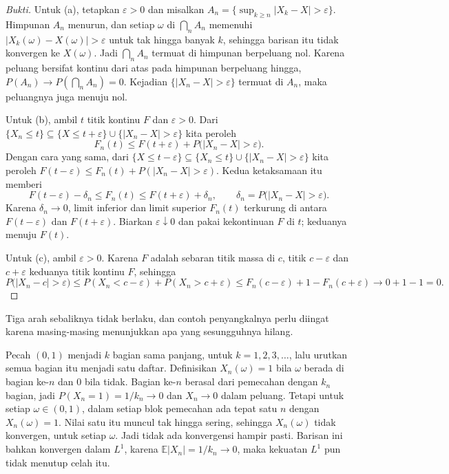 \begin{proof}[Bukti]
Untuk (a), tetapkan $\varepsilon>0$ dan misalkan
$A_n=\{\sup_{k\ge n}|X_k-X|>\varepsilon\}$. Himpunan $A_n$ menurun, dan setiap
$\omega$ di $\bigcap_n A_n$ memenuhi $|X_k(\omega)-X(\omega)|>\varepsilon$ untuk
tak hingga banyak $k$, sehingga barisan itu tidak konvergen ke $X(\omega)$.
Jadi $\bigcap_n A_n$ termuat di himpunan berpeluang nol. Karena peluang bersifat
kontinu dari atas pada himpunan berpeluang hingga,
$P(A_n)\to P(\bigcap_n A_n)=0$. Kejadian $\{|X_n-X|>\varepsilon\}$ termuat di
$A_n$, maka peluangnya juga menuju nol.

Untuk (b), ambil $t$ titik kontinu $F$ dan $\varepsilon>0$. Dari
$\{X_n\le t\}\subseteq\{X\le t+\varepsilon\}\cup\{|X_n-X|>\varepsilon\}$ kita
peroleh
\[
F_n(t)\le F(t+\varepsilon)+P\bigl(|X_n-X|>\varepsilon\bigr).
\]
Dengan cara yang sama, dari $\{X\le t-\varepsilon\}\subseteq\{X_n\le t\}\cup
\{|X_n-X|>\varepsilon\}$ kita peroleh
$F(t-\varepsilon)\le F_n(t)+P(|X_n-X|>\varepsilon)$. Kedua ketaksamaan itu
memberi
\[
F(t-\varepsilon)-\delta_n\le F_n(t)\le F(t+\varepsilon)+\delta_n,
\qquad \delta_n=P\bigl(|X_n-X|>\varepsilon\bigr).
\]
Karena $\delta_n\to0$, limit inferior dan limit superior $F_n(t)$ terkurung di
antara $F(t-\varepsilon)$ dan $F(t+\varepsilon)$. Biarkan $\varepsilon\downarrow0$
dan pakai kekontinuan $F$ di $t$; keduanya menuju $F(t)$.

Untuk (c), ambil $\varepsilon>0$. Karena $F$ adalah sebaran titik massa di $c$,
titik $c-\varepsilon$ dan $c+\varepsilon$ keduanya titik kontinu $F$, sehingga
\[
P\bigl(|X_n-c|>\varepsilon\bigr)
\le P(X_n<c-\varepsilon)+P(X_n>c+\varepsilon)
\le F_n(c-\varepsilon)+1-F_n(c+\varepsilon)
\to 0+1-1=0 .
\]
\end{proof}

Tiga arah sebaliknya tidak berlaku, dan contoh penyangkalnya perlu diingat karena
masing-masing menunjukkan apa yang sesungguhnya hilang.

\begin{contoh}
Pecah $(0,1)$ menjadi $k$ bagian sama panjang, untuk $k=1,2,3,\dots$, lalu
urutkan semua bagian itu menjadi satu daftar. Definisikan $X_n(\omega)=1$ bila
$\omega$ berada di bagian ke-$n$ dan $0$ bila tidak. Bagian ke-$n$ berasal dari
pemecahan dengan $k_n$ bagian, jadi $P(X_n=1)=1/k_n\to0$ dan $X_n\to0$ dalam
peluang. Tetapi untuk setiap $\omega\in(0,1)$, dalam setiap blok pemecahan ada
tepat satu $n$ dengan $X_n(\omega)=1$. Nilai satu itu muncul tak hingga sering,
sehingga $X_n(\omega)$ tidak konvergen, untuk setiap $\omega$. Jadi tidak ada
konvergensi hampir pasti. Barisan ini bahkan konvergen dalam $L^1$, karena
$\mathbb{E}|X_n|=1/k_n\to0$, maka kekuatan $L^1$ pun tidak menutup celah itu.
\end{contoh}

